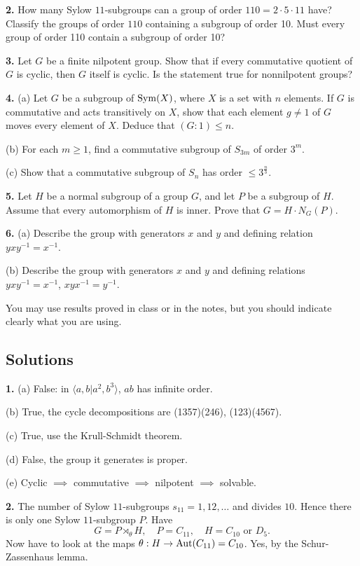 \documentclass[a4paper,11pt,final]{memoir}%
\theoremstyle{nonumberplain}
\begin{document}
\bigskip\noindent\textbf{2.} How many Sylow $11$-subgroups can a group of
order $110=2\cdot5\cdot11$ have? Classify the groups of order $110$ containing
a subgroup of order 10. Must every group of order 110 contain a subgroup of
order 10?

\bigskip\noindent\textbf{3.} Let $G$ be a finite nilpotent group. Show that if
every commutative quotient of $G$ is cyclic, then $G$ itself is cyclic. Is the
statement true for nonnilpotent groups?

\bigskip\noindent\textbf{4.} (a) Let $G$ be a subgroup of $\operatorname{Sym}(X)$, where $X$
is a set with $n$ elements. If $G$ is commutative and acts transitively on
$X$, show that each element $g\neq1$ of $G$ moves every element of $X$. Deduce
that $(G:1)\leq n$.

\noindent(b) For each $m\geq1$, find a commutative subgroup of $S_{3m}$ of
order $3^{m}$.

\noindent(c) Show that a commutative subgroup of $S_{n}$ has order
$\leq3^{\frac n3}$.

\bigskip\noindent\textbf{5.} Let $H$ be a normal subgroup of a group $G$, and
let $P$ be a subgroup of $H$. Assume that every automorphism of $H$ is inner.
Prove that $G=H\cdot N_{G}(P)$.

\bigskip\noindent\textbf{6.} (a) Describe the group with generators $x$ and
$y$ and defining relation $yxy^{-1}=x^{-1}$.

\noindent(b) Describe the group with generators $x$ and $y$ and defining
relations $yxy^{-1}=x^{-1}$, $xyx^{-1}=y^{-1}$.

\bigskip\noindent You may use results proved in class or in the notes, but you
should indicate clearly what you are using.

\clearpage


\subsection{Solutions}

\noindent\textbf{1.} (a) False: in $\langle a,b|a^{2},b^{3}\rangle$, $ab$ has
infinite order.

(b) True, the cycle decompositions are (1357)(246), (123)(4567).

(c) True, use the Krull-Schmidt theorem.

(d) False, the group it generates is proper.

(e) Cyclic $\implies$ commutative $\implies$ nilpotent $\implies$ solvable.

\bigskip\noindent\textbf{2.} The number of Sylow $11$-subgroups $s_{11}%
=1,12,\ldots$ and divides $10$. Hence there is only one Sylow $11$-subgroup
$P$. Have
\[
G=P\rtimes_{\theta}H,\quad P=C_{11},\quad H=C_{10}\text{ or }D_{5}.
\]
Now have to look at the maps $\theta:H\rightarrow\operatorname{Aut}(C_{11})=C_{10}$. Yes, by
the Schur-Zassenhaus lemma.
\end{document}
